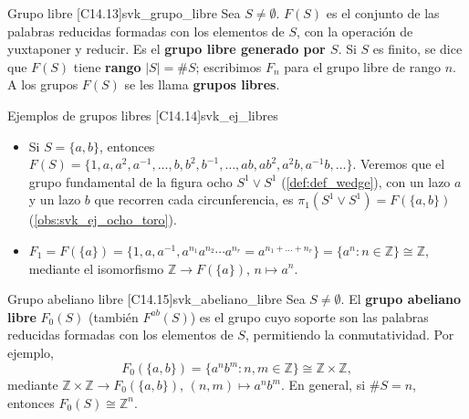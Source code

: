 \begin{definicion}{Grupo libre [C14.13]}{svk_grupo_libre}
Sea $S \neq \emptyset$. $F(S)$ es el conjunto de las palabras reducidas formadas con los elementos de $S$, con la operación de yuxtaponer y reducir. Es el \textbf{grupo libre generado por $S$}. Si $S$ es finito, se dice que $F(S)$ tiene \textbf{rango} $|S| = \#S$; escribimos $F_n$ para el grupo libre de rango $n$. A los grupos $F(S)$ se les llama \textbf{grupos libres}.
\end{definicion}

\begin{observacion}{Ejemplos de grupos libres [C14.14]}{svk_ej_libres}
\begin{itemize}
    \item Si $S = \{a, b\}$, entonces $F(S) = \{1, a, a^2, a^{-1}, \dots, b, b^2, b^{-1}, \dots, ab, ab^2, a^2b, a^{-1}b, \dots\}$. Veremos que el grupo fundamental de la figura ocho $S^1 \vee S^1$ (\cref{def:def_wedge}), con un lazo $a$ y un lazo $b$ que recorren cada circunferencia, es $\pi_1(S^1 \vee S^1) = F(\{a,b\})$ (\cref{obs:svk_ej_ocho_toro}).
    \item $F_1 = F(\{a\}) = \{1, a, a^{-1}, a^{n_1} a^{n_2} \cdots a^{n_r} = a^{n_1 + \dots + n_r}\} = \{a^n : n \in \mathbb{Z}\} \cong \mathbb{Z}$, mediante el isomorfismo $\mathbb{Z} \to F(\{a\})$, $n \mapsto a^n$.
\end{itemize}
\begin{center}
\begin{minipage}{\linewidth}
\centering
{}
\end{minipage}
\end{center}
\end{observacion}

\begin{definicion}{Grupo abeliano libre [C14.15]}{svk_abeliano_libre}
Sea $S \neq \emptyset$. El \textbf{grupo abeliano libre} $F_0(S)$ (también $F^{ab}(S)$) es el grupo cuyo soporte son las palabras reducidas formadas con los elementos de $S$, permitiendo la conmutatividad. Por ejemplo,
\[ F_0(\{a, b\}) = \{a^n b^m : n, m \in \mathbb{Z}\} \cong \mathbb{Z} \times \mathbb{Z}, \]
mediante $\mathbb{Z} \times \mathbb{Z} \to F_0(\{a,b\})$, $(n,m) \mapsto a^n b^m$.
En general, si $\#S = n$, entonces $F_0(S) \cong \mathbb{Z}^n$.
\end{definicion}

